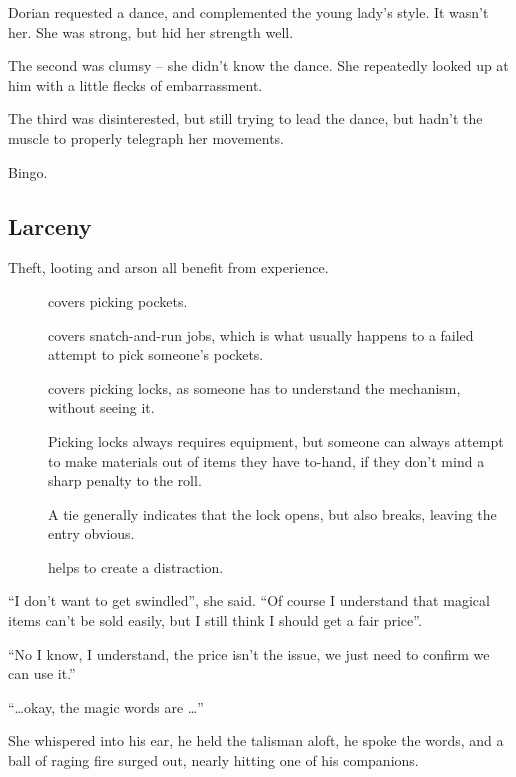 \begin{multicols}{2}
\begin{exampletext}
  Dorian requested a dance, and complemented the young lady's style.
  It wasn't her.
  She was strong, but hid her strength well.

  The second was clumsy -- she didn't know the dance.
  She repeatedly looked up at him with a little flecks of embarrassment.

  The third was disinterested, but still trying to lead the dance, but hadn't the muscle to properly telegraph her movements.

  Bingo.
\end{exampletext}

\subsection{Larceny}

Theft, looting and arson all benefit from experience.

\begin{description}
  \item[]
    covers picking pockets.
  \item[]
    covers snatch-and-run jobs, which is what usually happens to a failed attempt to pick someone's pockets.
  \item[]
    covers picking locks, as someone has to understand the mechanism, without seeing it.

    Picking locks always requires equipment, but someone can always attempt to make materials out of items they have to-hand, if they don't mind a sharp penalty to the roll.

    A tie generally indicates that the lock opens, but also breaks, leaving the entry obvious.

  \item[]
    helps to create a distraction.
\end{description}

\begin{exampletext}
  ``I don't want to get swindled'', she said.
  ``Of course I understand that magical items can't be sold easily, but I still think I should get a fair price''.

  ``No I know, I understand, the price isn't the issue, we just need to confirm we can use it.''

  ``\ldots okay, the magic words are \ldots''

  She whispered into his ear, he held the talisman aloft, he spoke the words, and a ball of raging fire surged out, nearly hitting one of his companions.


\end{exampletext}
\end{multicols}
